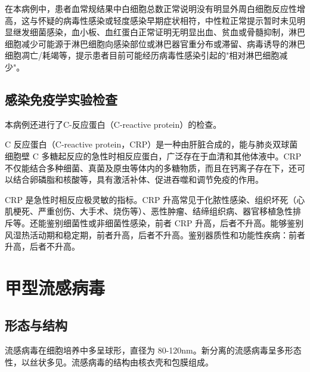 \documentclass[9pt,a4paper,twoside]{rho-class/rho}
\begin{document}
    在本病例中，患者血常规结果中白细胞总数正常说明没有明显外周白细胞反应性增高，这与怀疑的病毒性感染或轻度感染早期症状相符，中性粒正常提示暂时未见明显继发细菌感染，血小板、血红蛋白正常证明无明显出血、贫血或骨髓抑制，淋巴细胞减少可能源于淋巴细胞向感染部位或淋巴器官重分布或滞留、病毒诱导的淋巴细胞凋亡/耗竭等，提示患者目前可能经历病毒性感染引起的"相对淋巴细胞减少"。

    \subsection{感染免疫学实验检查}

    本病例还进行了C-反应蛋白（C-reactive protein）的检查。

    C 反应蛋白（C-reactive protein，CRP）是一种由肝脏合成的，能与肺炎双球菌细胞壁 C 多糖起反应的急性时相反应蛋白，广泛存在于血清和其他体液中。CRP 不仅能结合多种细菌、真菌及原虫等体内的多糖物质，而且在钙离子存在下，还可以结合卵磷脂和核酸等，具有激活补体、促进吞噬和调节免疫的作用。

    CRP 是急性时相反应极灵敏的指标。CRP 升高常见于化脓性感染、组织坏死（心肌梗死、严重创伤、大手术、烧伤等）、恶性肿瘤、结缔组织病、器官移植急性排斥等。还能鉴别细菌性或非细菌性感染，前者 CRP 升高，后者不升高。能够鉴别风湿热活动期和稳定期，前者升高，后者不升高。鉴别器质性和功能性疾病：前者升高，后者不升高。


\section{甲型流感病毒}

\subsection{形态与结构}

    流感病毒在细胞培养中多呈球形，直径为 80-120nm。新分离的流感病毒呈多形态性，以丝状多见。流感病毒的结构由核衣壳和包膜组成。
    
\end{document}
